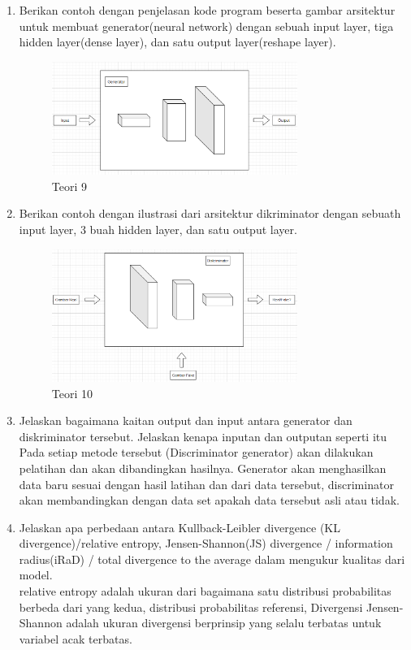 \begin{enumerate}
\item Berikan contoh dengan penjelasan kode program beserta gambar arsitektur untuk membuat generator(neural network) dengan sebuah input layer, tiga hidden layer(dense layer), dan satu output layer(reshape layer).
	\hfill\\
	
	
\begin{figure}[H]
    \includegraphics[width=8cm]{figures/1174076/figures8/teori9.png}
    \centering
    \caption{Teori 9}
\end{figure}


\item Berikan contoh dengan ilustrasi dari arsitektur dikriminator dengan sebuath input layer, 3 buah hidden layer, dan satu output layer.
	\hfill\\

\begin{figure}[H]
    \includegraphics[width=8cm]{figures/1174076/figures8/teori10.png}
    \centering
    \caption{Teori 10}
\end{figure}		
	

\item Jelaskan bagaimana kaitan output dan input antara generator dan diskriminator tersebut. Jelaskan kenapa inputan dan outputan seperti itu
	\hfill\\
	Pada setiap metode tersebut (Discriminator generator) akan dilakukan pelatihan dan akan dibandingkan hasilnya. Generator akan menghasilkan data baru sesuai dengan hasil latihan dan dari data tersebut, discriminator akan membandingkan dengan data set apakah data tersebut asli atau tidak.
	

\item Jelaskan apa perbedaan antara Kullback-Leibler divergence (KL divergence)/relative entropy, Jensen-Shannon(JS) divergence / information radius(iRaD) / total divergence to the average dalam mengukur kualitas dari model.
	\hfill\\
	relative entropy adalah ukuran dari bagaimana satu distribusi probabilitas berbeda dari yang kedua, distribusi probabilitas referensi, Divergensi Jensen-Shannon adalah ukuran divergensi berprinsip yang selalu terbatas untuk variabel acak terbatas.



\end{enumerate}
